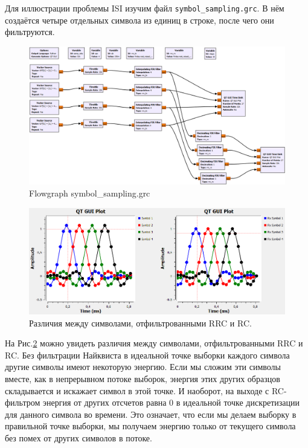 \documentclass[a4paper, 14pt]{extarticle}
\begin{document}
    Для иллюстрации проблемы ISI изучим файл \texttt{symbol\_sampling.grc}.
    В нём создаётся четыре отдельных символа из единиц в строке, после чего они фильтруются.

    \begin{figure}[h]
        \centering
        \includegraphics[width=0.9\linewidth]{resources/Images/task3_symbol_sampling}
        \caption{Flowgraph symbol\_sampling.grc}
        \label{fig:task3_symbol_sampling}
    \end{figure}

    \begin{figure}[h]
        \centering
        \includegraphics[width=0.8\linewidth]{resources/Images/task3_RRC_RC_filtered_symbols}
        \caption{Различия между символами, отфильтрованными RRC и RC.}
        \label{fig:task3_RRC_RC_filtered_symbols}
    \end{figure}

    На Рис.\ref{fig:task3_RRC_RC_filtered_symbols} можно увидеть различия между символами, отфильтрованными RRC и RC.
    Без фильтрации Найквиста в идеальной точке выборки каждого символа другие символы имеют некоторую энергию.
    Если мы сложим эти символы вместе, как в непрерывном потоке выборок, энергия этих других образцов складывается
    и искажает символ в этой точке.
    И наоборот, на выходе с RC-фильтром энергия от других отсчетов равна 0 в идеальной точке дискретизации
    для данного символа во времени.
    Это означает, что если мы делаем выборку в правильной точке выборки, мы получаем энергию только от
    текущего символа без помех от других символов в потоке.
\end{document}
